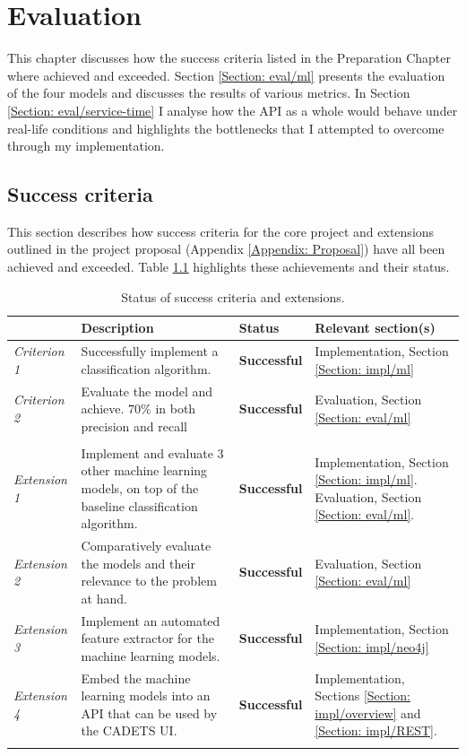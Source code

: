 
	\chapter{Evaluation}
	This chapter discusses how the success criteria listed in the Preparation Chapter where achieved and exceeded.  Section \ref{Section: eval/ml} presents the evaluation of the four models and discusses the results of various metrics. In Section \ref{Section: eval/service-time} I analyse how the API as a whole would behave under real-life conditions and highlights the bottlenecks that I attempted to overcome through my implementation.
	\section{Success criteria} \label{Section: eval/success-criteria}
		This section describes how success criteria for the core project and extensions outlined in the project proposal (Appendix \ref{Appendix: Proposal}) have all been achieved and exceeded. Table \ref{Table: eval/success/status} highlights these achievements and their status. 
		\begin{longtable}{|p{}|p{}|p{}|p{}|}
			\hline
			& \textbf{Description} & \textbf{Status} & \textbf{Relevant section(s)} \\
			\hline
			\textit{Criterion 1} & Successfully implement a classification algorithm. & \textbf{Successful} & Implementation, Section \ref{Section: impl/ml} \\
			\hline
			\textit{Criterion 2} & Evaluate the model and achieve. $70\%$ in both precision and recall & \textbf{Successful} & Evaluation, Section \ref{Section: eval/ml} \\
			\hhline{====}
			\multicolumn{4}{|c|}{\textbf{Extensions}} \\
			\hhline{====}
			\textit{Extension 1} & Implement and evaluate 3 other machine learning models, on top of the baseline classification algorithm. & \textbf{Successful} & Implementation, Section \ref{Section: impl/ml}. Evaluation, Section \ref{Section: eval/ml}.\\
			\hline
			\textit{Extension 2} & Comparatively evaluate the models and their relevance to the problem at hand. & \textbf{Successful} & Evaluation, Section \ref{Section: eval/ml} \\
			\hline
			\textit{Extension 3} & Implement an automated feature extractor for the machine learning models. & \textbf{Successful} & Implementation, Section \ref{Section: impl/neo4j} \\
			\hline
			\textit{Extension 4} & Embed the machine learning models into an API that can be used by the CADETS UI. & \textbf{Successful} & Implementation, Sections \ref{Section: impl/overview} and \ref{Section: impl/REST}. \\
			\hline
			\caption{Status of success criteria and extensions.}
			\label{Table: eval/success/status}
		\end{longtable}
		
